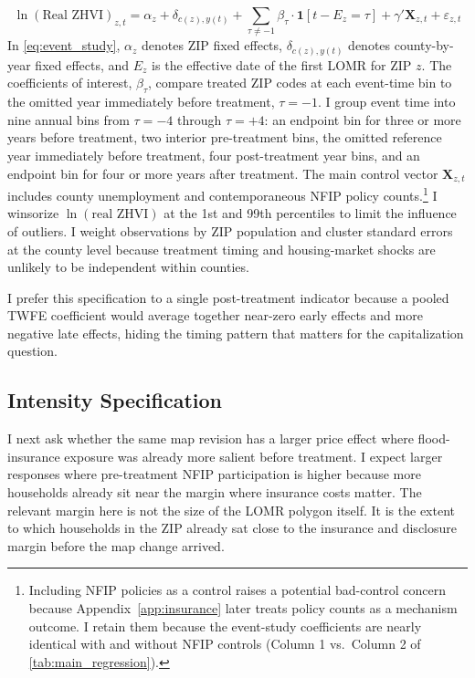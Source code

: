 \documentclass[12pt]{article}
\begin{document}
\begin{equation}\label{eq:event_study}
    \ln(\text{Real ZHVI})_{z,t} = \alpha_z + \delta_{c(z),y(t)} + \sum_{\tau \neq -1} \beta_\tau \cdot \mathbf{1}[t - E_z = \tau] + \gamma' \mathbf{X}_{z,t} + \varepsilon_{z,t}
\end{equation}
%
\noindent In \autoref{eq:event_study}, $\alpha_z$ denotes ZIP fixed effects, $\delta_{c(z),y(t)}$ denotes county-by-year fixed effects, and $E_z$ is the effective date of the first LOMR for ZIP $z$. The coefficients of interest, $\beta_\tau$, compare treated ZIP codes at each event-time bin to the omitted year immediately before treatment, $\tau = -1$. I group event time into nine annual bins from $\tau = -4$ through $\tau = +4$: an endpoint bin for three or more years before treatment, two interior pre-treatment bins, the omitted reference year immediately before treatment, four post-treatment year bins, and an endpoint bin for four or more years after treatment. The main control vector $\mathbf{X}_{z,t}$ includes county unemployment and contemporaneous NFIP policy counts.\footnote{Including NFIP policies as a control raises a potential bad-control concern because Appendix~\ref{app:insurance} later treats policy counts as a mechanism outcome. I retain them because the event-study coefficients are nearly identical with and without NFIP controls (Column 1 vs.\ Column 2 of \autoref{tab:main_regression}).} I winsorize $\ln(\text{real ZHVI})$ at the 1st and 99th percentiles to limit the influence of outliers. I weight observations by ZIP population and cluster standard errors at the county level because treatment timing and housing-market shocks are unlikely to be independent within counties.

I prefer this specification to a single post-treatment indicator because a pooled TWFE coefficient would average together near-zero early effects and more negative late effects, hiding the timing pattern that matters for the capitalization question.

\subsection{Intensity Specification}\label{sec:strategy_intensity}

I next ask whether the same map revision has a larger price effect where flood-insurance exposure was already more salient before treatment. I expect larger responses where pre-treatment NFIP participation is higher because more households already sit near the margin where insurance costs matter. The relevant margin here is not the size of the LOMR polygon itself. It is the extent to which households in the ZIP already sat close to the insurance and disclosure margin before the map change arrived.
\end{document}
